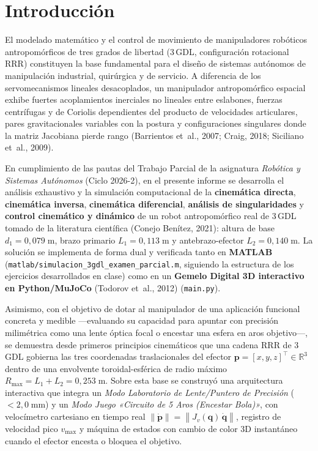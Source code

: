 \documentclass[11pt,a4paper]{article}
\newcommand{\Real}{\mathbb{R}}
\newcommand{\T}{^{\!\top}}
\newcommand{\norm}[1]{\left\lVert#1\right\rVert}
\newcommand{\qdot}{\dot{\bm{q}}}
\newcommand{\pdot}{\dot{\bm{p}}}
\begin{document}
\tableofcontents
\newpage

\section{Introducción}

El modelado matemático y el control de movimiento de manipuladores robóticos antropomórficos de tres grados de libertad (3\,GDL, configuración rotacional RRR) constituyen la base fundamental para el diseño de sistemas autónomos de manipulación industrial, quirúrgica y de servicio. A diferencia de los servomecanismos lineales desacoplados, un manipulador antropomórfico espacial exhibe fuertes acoplamientos inerciales no lineales entre eslabones, fuerzas centrífugas y de Coriolis dependientes del producto de velocidades articulares, pares gravitacionales variables con la postura y configuraciones singulares donde la matriz Jacobiana pierde rango (Barrientos et~al., 2007; Craig, 2018; Siciliano et~al., 2009).

En cumplimiento de las pautas del Trabajo Parcial de la asignatura \emph{Robótica y Sistemas Autónomos} (Ciclo 2026-2), en el presente informe se desarrolla el análisis exhaustivo y la simulación computacional de la \textbf{cinemática directa}, \textbf{cinemática inversa}, \textbf{cinemática diferencial}, \textbf{análisis de singularidades} y \textbf{control cinemático y dinámico} de un robot antropomórfico real de 3\,GDL tomado de la literatura científica (Conejo Benítez, 2021): altura de base $d_{1}=0{,}079\;\text{m}$, brazo primario $L_{1}=0{,}113\;\text{m}$ y antebrazo-efector $L_{2}=0{,}140\;\text{m}$. La solución se implementa de forma dual y verificada tanto en \textbf{MATLAB} (\texttt{matlab/simulacion\_3gdl\_examen\_parcial.m}, siguiendo la estructura de los ejercicios desarrollados en clase) como en un \textbf{Gemelo Digital 3D interactivo en Python/MuJoCo} (Todorov et~al., 2012) (\texttt{main.py}).

Asimismo, con el objetivo de dotar al manipulador de una aplicación funcional concreta y medible ---evaluando su capacidad para apuntar con precisión milimétrica como una lente óptica focal o encestar una esfera en aros objetivo---, se demuestra desde primeros principios cinemáticos que una cadena RRR de 3\,GDL gobierna las tres coordenadas traslacionales del efector $\bm{p}=[x,y,z]\T\in\Real^{3}$ dentro de una envolvente toroidal-esférica de radio máximo $R_{\max}=L_{1}+L_{2}=0{,}253\;\text{m}$. Sobre esta base se construyó una arquitectura interactiva que integra un \emph{Modo Laboratorio de Lente/Puntero de Precisión} ($<2{,}0\;\text{mm}$) y un \emph{Modo Juego «Circuito de 5 Aros (Encestar Bola)»}, con velocímetro cartesiano en tiempo real $\norm{\pdot}=\norm{J_{v}(\bm{q})\,\qdot}$, registro de velocidad pico $v_{\max}$ y máquina de estados con cambio de color 3D instantáneo cuando el efector encesta o bloquea el objetivo.
\end{document}

